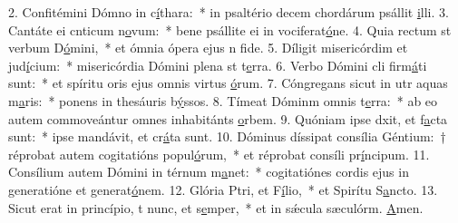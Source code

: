 2. Confitémini Dómno in c\uline{í}thara:~* in psaltério decem chordárum psállit \uline{i}lli.
3. Cantáte ei cnticum n\uline{o}vum:~* bene psállite ei in vociferat\uline{ó}ne.
4. Quia rectum st verbum D\uline{ó}mini,~* et ómnia ópera ejus n f\uline{i}de.
5. Díligit misericórdim et jud\uline{í}cium:~* misericórdia Dómini plena st t\uline{e}rra.
6. Verbo Dómini cli firm\uline{á}ti sunt:~* et spíritu oris ejus omnis virtus \uline{ó}rum.
7. Cóngregans sicut in utr aquas m\uline{a}ris:~* ponens in thesáuris b\uline{ý}ssos.
8. Tímeat Dóminm omnis t\uline{e}rra:~* ab eo autem commoveántur omnes inhabitánts \uline{o}rbem.
9. Quóniam ipse dxit, et f\uline{a}cta sunt:~* ipse mandávit, et cr\uline{á}ta sunt.
10. Dóminus díssipat consília Géntium:~† réprobat autem cogitatións popul\uline{ó}rum,~* et réprobat consíli pr\uline{í}ncipum.
11. Consílium autem Dómini in térnum m\uline{a}net:~* cogitatiónes cordis ejus in generatióne et generat\uline{ó}nem.
12. Glória Ptri, et F\uline{í}lio,~* et Spirítu S\uline{a}ncto.
13. Sicut erat in princípio, t nunc, et s\uline{e}mper,~* et in sǽcula sæculórm. \uline{A}men.
